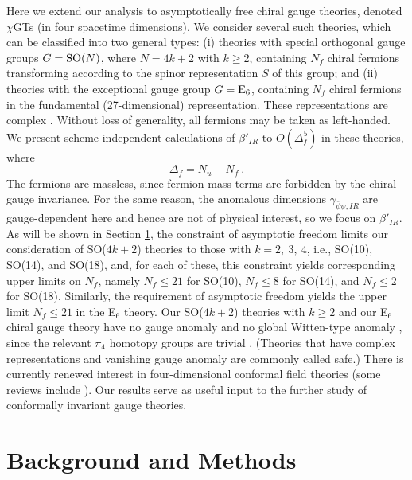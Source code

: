 \documentclass[prd,twocolumn,nofootinbib,amsfonts,amssymb]{revtex4}
\newcommand{\beq}{\begin{equation}}
\newcommand{\eeq}{\end{equation}}
\begin{document}
Here we extend our analysis to asymptotically free chiral gauge theories,
denoted $\chi$GTs (in four spacetime dimensions).  We consider several such
theories, which can be classified into two general types: (i) theories with
special orthogonal gauge groups $G={\rm SO}(N)$, where $N=4k+2$ with $k \ge 2$,
containing $N_f$ chiral fermions transforming according to the spinor
representation $S$ of this group; and (ii) theories with the
exceptional gauge group $G={\rm E}_6$, containing $N_f$ chiral fermions in the
fundamental (27-dimensional) representation.  These representations are complex
\cite{mehta}. Without loss of generality, all
fermions may be taken as left-handed. We present scheme-independent
calculations of $\beta'_{IR}$ to $O(\Delta_f^5)$ in these theories, where
%
\beq
\Delta_f = N_u - N_f \ .  
\label{deltaf}
\eeq
%
The fermions are massless, since fermion mass terms are forbidden by the chiral
gauge invariance.  For the same reason, the anomalous dimensions
$\gamma_{\bar\psi\psi,IR}$ are gauge-dependent here and hence are not of
physical interest, so we focus on $\beta'_{IR}$.  As will be shown in Section
\ref{methods_section}, the constraint of asymptotic freedom limits our
consideration of SO($4k+2$) theories to those with $k=2, \ 3, \ 4$, i.e.,
SO(10), SO(14), and SO(18), and, for each of these, this constraint yields
corresponding upper limits on $N_f$, namely $N_f \le 21$ for SO(10), $N_f \le
8$ for SO(14), and $N_f \le 2$ for SO(18). Similarly, the requirement of
asymptotic freedom yields the upper limit $N_f \le 21$ in the E$_6$ theory. Our
SO($4k+2$) theories with $k \ge 2$ and our E$_6$ chiral gauge theory have no
gauge anomaly \cite{gg,gp} and no global Witten-type anomaly \cite{witten},
since the relevant $\pi_4$ homotopy groups are trivial \cite{pi4}.  (Theories
that have complex representations and vanishing gauge anomaly are commonly
called safe.)  There is currently renewed interest in four-dimensional
conformal field theories (some reviews include \cite{cft}).  Our results serve
as useful input to the further study of conformally invariant gauge theories.


\section{Background and Methods} 
\label{methods_section} 

\end{document}
